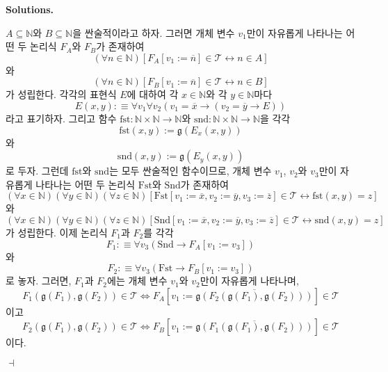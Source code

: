 \documentclass[12pt]{paper}
\newcommand{\gnum}
{ \mathfrak{g}
}
\newenvironment{context}[1][]
{ \noindent \textbf{{#1}.}
}
{ \hfill $ \dashv $
}
\begin{document}
\begin{context}[Solutions]
\begin{enumerate}
      $A \subseteq \mathbb{N}$와 $B \subseteq \mathbb{N}$을 싼술적이라고 하자.
      그러면 개체 변수 $v_1$만이 자유롭게 나타나는 어떤 두 논리식 $F_A$와 $F_B$가 존재하여
      $$ \left( \forall n \in \mathbb{N} \right) \left[ F_A \left[ v_1 := \overline{n} \right] \in \mathcal{T} \leftrightarrow n \in A \right]$$와
      $$ \left( \forall n \in \mathbb{N} \right) \left[ F_B \left[ v_1 := \overline{n} \right] \in \mathcal{T} \leftrightarrow n \in B \right]$$가 성립한다.
      각각의 표현식 $E$에 대하여 각 $x \in \mathbb{N}$와 각 $y \in \mathbb{N}$마다 $$E \left( x , y \right) : \equiv \forall v_1 \forall v_2 \left( v_1 = \overline{x} \rightarrow \left( v_2 = \overline{y} \rightarrow E \right) \right)$$라고 표기하자.
      그리고 함수 $\mathrm{fst} : \mathbb{N} \times \mathbb{N} \to \mathbb{N}$와 $\mathrm{snd} : \mathbb{N} \times \mathbb{N} \to \mathbb{N}$을
      각각 $$ \mathrm{fst} \left( x , y \right) := \gnum \left( E_x \left( x , y \right) \right)$$와
      $$\mathrm{snd} \left( x , y \right) := \gnum \left( E_y \left( x , y \right) \right)$$로 두자.
      그런데 $\mathrm{fst}$와 $\mathrm{snd}$는 모두 싼술적인 함수이므로,
      개체 변수 $v_1$, $v_2$와 $v_3$만이 자유롭게 나타나는 어떤 두 논리식 $\mathrm{Fst}$와 $\mathrm{Snd}$가 존재하여
      $$ \left( \forall x \in \mathbb{N} \right) \left( \forall y \in \mathbb{N} \right) \left( \forall z \in \mathbb{N} \right) \left[ \mathrm{Fst} \left[ v_1 := \overline{x} , v_2 := \overline{y} , v_3 := \overline{z} \right] \in \mathcal{T} \leftrightarrow \mathrm{fst} \left( x , y \right) = z \right] $$와
      $$ \left( \forall x \in \mathbb{N} \right) \left( \forall y \in \mathbb{N} \right) \left( \forall z \in \mathbb{N} \right) \left[ \mathrm{Snd} \left[ v_1 := \overline{x} , v_2 := \overline{y} , v_3 := \overline{z} \right] \in \mathcal{T} \leftrightarrow \mathrm{snd} \left( x , y \right) = z \right] $$가 성립한다.
      이제 논리식 $F_1$과 $F_2$를 각각 $$F_1 : \equiv \forall v_3 \left( \mathrm{Snd} \rightarrow F_A \left[ v_1 := v_3 \right] \right)$$와 $$F_2 : \equiv \forall v_3 \left( \mathrm{Fst} \rightarrow F_B \left[ v_1 := v_3 \right] \right)$$로 놓자.
      그러면, $F_1$과 $F_2$에는 개체 변수 $v_1$와 $v_2$만이 자유롭게 나타나며, $$F_1 \left( \gnum \left( F_1 \right) , \gnum \left( F_2 \right) \right) \in \mathcal{T} \iff F_A \left[ v_1 := \overline{\gnum \left( F_2 \left( \gnum \left( F_1 \right) , \gnum \left( F_2 \right) \right) \right)} \right] \in \mathcal{T}$$이고
      $$F_2 \left( \gnum \left( F_1 \right) , \gnum \left( F_2 \right) \right) \in \mathcal{T} \iff F_B \left[ v_1 := \overline{\gnum \left( F_1 \left( \gnum \left( F_1 \right) , \gnum \left( F_2 \right) \right) \right)} \right] \in \mathcal{T}$$이다.

\end{enumerate}
\end{context}
\end{document}
